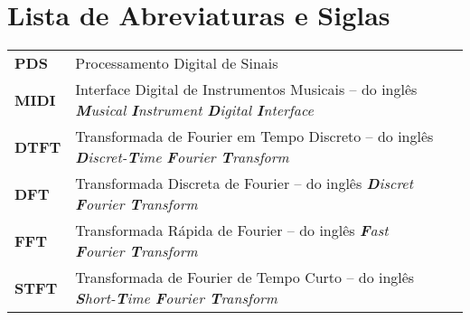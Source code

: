 
\chapter*{Lista de Abreviaturas e Siglas}

\begin{longtable}{lL{14cm}L{\textwidth}}

\textbf{PDS}  & Processamento Digital de Sinais & \\
\textbf{MIDI}  & Interface Digital de Instrumentos Musicais -- do inglês \textit{\textbf{M}usical \textbf{I}nstrument \textbf{D}igital \textbf{I}nterface} & \\
\textbf{DTFT}  & Transformada de Fourier em Tempo Discreto -- do inglês \textit{\textbf{D}iscret-\textbf{T}ime \textbf{F}ourier \textbf{T}ransform} & \\
\textbf{DFT}  & Transformada Discreta de Fourier -- do inglês \textit{\textbf{D}iscret \textbf{F}ourier \textbf{T}ransform} & \\
\textbf{FFT}  & Transformada Rápida de Fourier -- do inglês \textit{\textbf{F}ast \textbf{F}ourier \textbf{T}ransform} & \\
\textbf{STFT}  & Transformada de Fourier de Tempo Curto -- do inglês \textit{\textbf{S}hort-\textbf{T}ime \textbf{F}ourier \textbf{T}ransform} & \\

\end{longtable}
